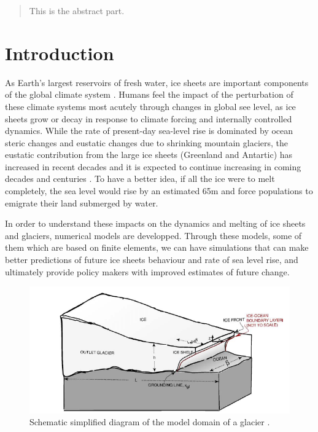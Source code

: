 \documentclass[a4paper,12pt]{article}
\begin{document}
\tableofcontents

\newpage
\begin{abstract}
	\justifying
	This is the abstract part. 
\end{abstract}
\pagebreak

\section{Introduction}
\justifying
As Earth's largest reservoirs of fresh water, ice sheets are important components of the global climate system \cite[]{zhang2017comparison}. Humans feel the impact of the perturbation of these climate systems most acutely through changes in global see level, as ice sheets grow or decay in response to climate forcing and internally controlled dynamics. While the rate of present-day sea-level rise is dominated by ocean steric changes and eustatic changes due to shrinking mountain glaciers, the eustatic contribution from the large ice sheets (Greenland and Antartic) has increased in recent decades and it is expected to continue increasing in coming decades and centuries \cite[]{clark2015recent}. To have a better idea, if all the ice were to melt completely, the sea level would rise by an estimated 65m \cite[]{morlighem2017bedmachine,haywood2011pliocene} and force populations to emigrate their land submerged by water.

In order to understand these impacts on the dynamics and melting of ice sheets and glaciers, numerical models are developped. Through these models, some of them which are based on finite elements, we can have simulations that can make better predictions of future ice sheets behaviour and rate of sea level rise, and ultimately provide policy makers with improved estimates of future change.

\begin{figure}[!h]
	\centering
	\includegraphics[width=0.7\linewidth]{../fig/Scheme_grounding_line}
	\caption{Schematic simplified diagram of the model domain of a glacier \cite[]{parizek2010implications}.}
	\label{groundingline}
\end{figure}
\end{document}
